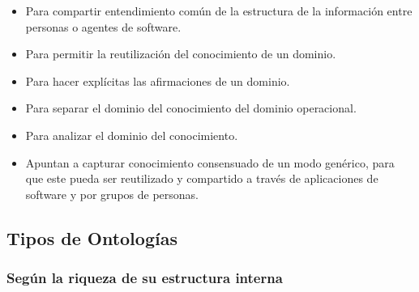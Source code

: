 \documentclass[a4paper,12pt,twoside,final,spanish]{article}
\begin{document}
\begin{itemize}
\item Para compartir entendimiento común de la estructura de la información entre personas o agentes de software.

\item Para permitir la reutilización del conocimiento de un dominio.

\item Para hacer explícitas las afirmaciones de un dominio.

\item Para separar el dominio del conocimiento del dominio operacional.

\item Para analizar el dominio del conocimiento.

\item Apuntan a capturar conocimiento consensuado de un modo genérico, para que este pueda ser reutilizado y compartido a través de aplicaciones de software y por grupos de personas.
\end{itemize}

\subsection{Tipos de Ontologías}

\subsubsection{Según la riqueza de su estructura interna}
\end{document}
